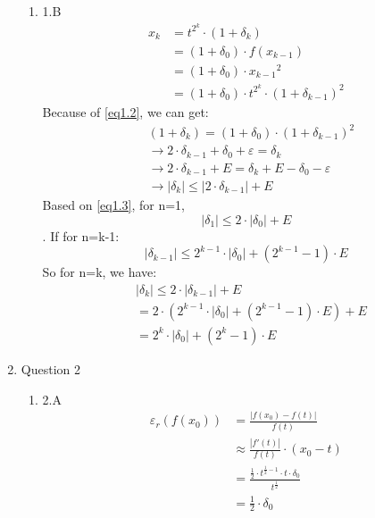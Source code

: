 \documentclass[12pt]{article}
\begin{document}
\begin{enumerate}
\begin{enumerate}
  \item 1.B
  \begin{equation}
  \begin{split}
  \label{eq1.2}
{x_k} &= {t^{{2^k}}} \cdot (1 + {\delta _k})\\
 &= (1 + {\delta _0}) \cdot f({x_{k - 1}})\\
 &= (1 + {\delta _0}) \cdot {x_{k - 1}}^2\\
 &= (1 + {\delta _0}) \cdot {t^{{2^k}}} \cdot {(1 + {\delta _{k-1}})^2}
  \end{split}
  \end{equation}  
  Because of \eqref{eq1.2}, we can get:
  \begin{equation}
  \begin{split}
  \label{eq1.3} 
 &(1 + {\delta _k}) = (1 + {\delta _0}) \cdot {(1 + {\delta _{k - 1}})^2}\\
 &\to 2 \cdot {\delta _{k - 1}} + {\delta _0} + \varepsilon  = {\delta _k}\\
 &\to 2 \cdot {\delta _{k - 1}} + E = {\delta _k} + E - {\delta _0} - \varepsilon \\
 &\to \left| {{\delta _k}} \right| \le \left| {2 \cdot {\delta _{k - 1}}} \right| + E
  \end{split}
  \end{equation} 
  Based on \eqref{eq1.3}, for n=1, \[\left| {{\delta _1}} \right| \le 2 \cdot \left| {{\delta _0}} \right| + E\].
  If for n=k-1: \[\left| {{\delta _{k - 1}}} \right| \le {2^{k - 1}} \cdot \left| {{\delta _0}} \right| + ({2^{k - 1}} - 1) \cdot E\]
  So for n=k, we have:
  \begin{equation}
  \begin{split}
  & \left| {{\delta _k}} \right| \le 2 \cdot \left| {{\delta _{k - 1}}} \right| + E\\
 &= 2 \cdot ({2^{k - 1}} \cdot \left| {{\delta _0}} \right| + ({2^{k - 1}} - 1) \cdot E) + E\\
 &= {2^k} \cdot \left| {{\delta _0}} \right| + ({2^k} - 1) \cdot E
  \end{split}
  \end{equation} 
  \end{enumerate}
 \newpage

\item Question 2
  \begin{enumerate}
  \item 2.A
  \begin{equation}
\begin{split}
  \label{eq2.1} 
{\varepsilon _r}(f({x_0})) &= \frac{{\left| {f({x_0}) - f(t)} \right|}}{{f(t)}}\\ 
&\approx \frac{{\left| {f'(t)} \right|}}{{f(t)}} \cdot ({x_0} - t) \\
&= \frac{{\frac{1}{2} \cdot {t^{\frac{1}{2} - 1}} \cdot t \cdot {\delta _0}}}{{{t^{\frac{1}{2}}}}} \\
&= \frac{1}{2} \cdot {\delta _0}
\end{split}
\end{equation}


\end{enumerate}
\end{enumerate}
\end{document}
